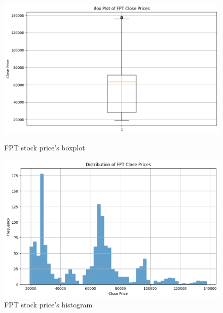 \documentclass{ieeeojies}
\begin{document}
\begin{figure}[H]
    \centering
    \begin{minipage}{0.23\textwidth}
        \centering
        \includegraphics[width=1\textwidth]{bibliography/Figure/FPT_Boxplot.png}
        \caption{FPT stock price's boxplot}
        \label{fig:1}
    \end{minipage}
    \hfill
    \begin{minipage}{0.23\textwidth}
        \centering
        \includegraphics[width=1\textwidth]{bibliography/Figure/FPT_histogram.png}
        \caption{FPT stock price's histogram}
        \label{fig:2}
    \end{minipage}
\end{figure}
\end{document}
